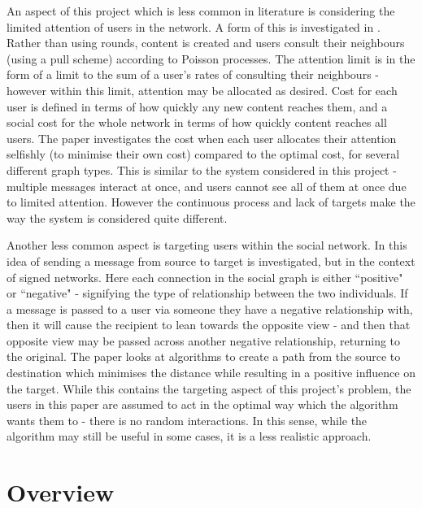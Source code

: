 \documentclass[bsc,frontabs,twoside,singlespacing,parskip,deptreport]{infthesis}     %
\begin{document}
An aspect of this project which is less common in literature is considering the limited attention of users in the network. A form of this is investigated in \cite{AllocatingAttention}. Rather than using rounds, content is created and users consult their neighbours (using a pull scheme) according to Poisson processes. The attention limit is in the form of a limit to the sum of a user's rates of consulting their neighbours - however within this limit, attention may be allocated as desired. Cost for each user is defined in terms of how quickly any new content reaches them, and a social cost for the whole network in terms of how quickly content reaches all users. The paper investigates the cost when each user allocates their attention selfishly (to minimise their own cost) compared to the optimal cost, for several different graph types. This is similar to the system considered in this project - multiple messages interact at once, and users cannot see all of them at once due to limited attention. However the continuous process and lack of targets make the way the system is considered quite different.

Another less common aspect is targeting users within the social network. In \cite{TargetedSignedNetworks} this idea of sending a message from source to target is investigated, but in the context of signed networks. Here each connection in the social graph is either ``positive" or ``negative" - signifying the type of relationship between the two individuals. If a message is passed to a user via someone they have a negative relationship with, then it will cause the recipient to lean towards the opposite view - and then that opposite view may be passed across another negative relationship, returning to the original. The paper looks at algorithms to create a path from the source to destination which minimises the distance while resulting in a positive influence on the target. While this contains the targeting aspect of this project's problem, the users in this paper are assumed to act in the optimal way which the algorithm wants them to - there is no random interactions. In this sense, while the algorithm may still be useful in some cases, it is a less realistic approach.

\section{Overview}
%
%
\end{document}
